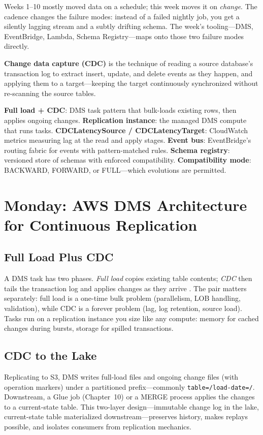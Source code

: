 Weeks 1--10 mostly moved data on a schedule; this week moves it on \emph{change}. The cadence changes the failure modes: instead of a failed nightly job, you get a silently lagging stream and a subtly drifting schema. The week's tooling---DMS, EventBridge, Lambda, Schema Registry---maps onto those two failure modes directly.

\begin{definitionbox}
\textbf{Change data capture (CDC)} is the technique of reading a source database's transaction log to extract insert, update, and delete events as they happen, and applying them to a target---keeping the target continuously synchronized without re-scanning the source tables.
\end{definitionbox}

\begin{keyterms}
\textbf{Full load + CDC}: DMS task pattern that bulk-loads existing rows, then applies ongoing changes. \textbf{Replication instance}: the managed DMS compute that runs tasks. \textbf{CDCLatencySource / CDCLatencyTarget}: CloudWatch metrics measuring lag at the read and apply stages. \textbf{Event bus}: EventBridge's routing fabric for events with pattern-matched rules. \textbf{Schema registry}: versioned store of schemas with enforced compatibility. \textbf{Compatibility mode}: BACKWARD, FORWARD, or FULL---which evolutions are permitted.
\end{keyterms}

\section{Monday: AWS DMS Architecture for Continuous Replication}
\subsection{Full Load Plus CDC}
A DMS task has two phases. \emph{Full load} copies existing table contents; \emph{CDC} then tails the transaction log and applies changes as they arrive \cite{awsDMSUserGuide}. The pair matters separately: full load is a one-time bulk problem (parallelism, LOB handling, validation), while CDC is a forever problem (lag, log retention, source load). Tasks run on a replication instance you size like any compute: memory for cached changes during bursts, storage for spilled transactions.

\subsection{CDC to the Lake}
Replicating to S3, DMS writes full-load files and ongoing change files (with operation markers) under a partitioned prefix---commonly \texttt{table=/load-date=/}. Downstream, a Glue job (Chapter~10) or a MERGE process applies the changes to a current-state table. This two-layer design---immutable change log in the lake, current-state table materialized downstream---preserves history, makes replays possible, and isolates consumers from replication mechanics.

